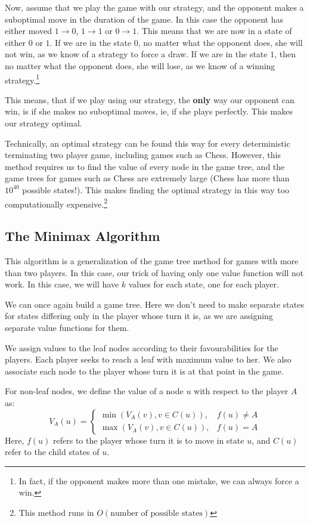 \documentclass[12pt]{report}
\begin{document}
Now, assume that we play the game with our strategy, and the opponent makes a suboptimal move in the duration of the game. In this case the opponent has either 
moved $1 \rightarrow 0$, $1 \rightarrow 1$ or $0 \rightarrow 1$. This means that we are now in a state of either $0$ or $1$. If we are in the state $0$, no matter what the opponent does, she will
not win, as we know of a strategy to force a draw. If we are in the state $1$, then no matter what the opponent does, she will lose, as we know of a winning strategy.\footnote{In fact, if the opponent makes more than one mistake, we can always force a win.}

This means, that if we play using our strategy, the \textbf{only} way our opponent can win, is if she makes no suboptimal moves, ie, if she plays perfectly. This makes our strategy optimal.

Technically, an optimal strategy can be found this way for every deterministic terminating two player game, including games such as Chess. However, this method requires us to find the value of every node in the game tree, and the game trees 
for games such as Chess are extremely large (Chess has more than $10^{40}$ possible states!). This makes finding the optimal strategy in this way too computationally expensive.\footnote{This method runs in $O(\text{number of possible states})$}
\subsection{The Minimax Algorithm}
This algorithm is a generalization of the game tree method for games with more than two players. In this case, our trick of having only one value function will not work.
In this case, we will have $k$ values for each state, one for each player.

We can once again build a game tree. Here we don't need to make separate states for states differing only in the player whose turn it is, as we are assigning separate value functions for them.

We assign values to the leaf nodes according to their favourabilities for the players. Each player seeks to reach a leaf with maximum value to her. We also associate each node to the player whose turn it is at that point in the game.

For non-leaf nodes, we define the value of a node $u$ with respect to the player $A$ as:
\begin{equation}
    V_{A}(u) = \begin{cases}
        \min(V_{A}(v),  v \in C(u)), & f(u) \neq A\\
        \max(V_{A}(v), v \in C(u)), & f(u) = A
    \end{cases}
\end{equation}
Here, $f(u)$ refers to the player whose turn it is to move in state $u$, and $C(u)$ refer to the child states of $u$.
\end{document}
